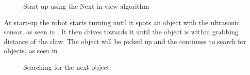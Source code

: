 \begin{figure}[H]
     \caption{\label{fig:object_navigation_niv} Start-up using the Next-in-view algorithm}
\end{figure}

At start-up the robot starts turning until it spots an object with the ultrasonic sensor, as seen in . It then drives towards it until the object is within grabbing distance of the claw. The object will be picked up and the \projname{} continues to search for objects, as seen in 

\begin{figure}[H]
     \caption{\label{fig:object_navigation_niv2} Searching for the next object}
\end{figure} 

